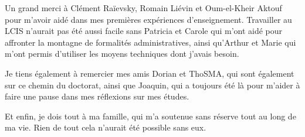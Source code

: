 Un grand merci à Clément Raïevsky, Romain Liévin et Oum-el-Kheir Aktouf pour m’avoir aidé dans mes premières expériences d’enseignement. Travailler au LCIS n’aurait pas été aussi facile sans Patricia et Carole qui m'ont aidé pour affronter la montagne de formalités administratives, ainsi qu'Arthur et Marie qui m'ont permis d'utiliser les moyens techniques dont j'avais besoin.

Je tiens également à remercier mes amis Dorian et ThoSMA, qui sont également sur ce chemin du doctorat, ainsi que Joaquin, qui a toujours été là pour m’aider à faire une pause dans mes réflexions sur mes études.

Et enfin, je dois tout à ma famille, qui m’a soutenue sans réserve tout au long de ma vie. Rien de tout cela n’aurait été possible sans eux.


\endgroup



